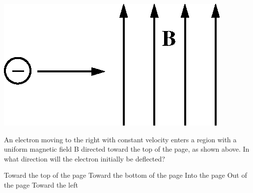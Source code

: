 \begin{center}
\includegraphics[scale=0.25]{images/img-013-026.png}
\end{center}

\begin{questions}\setcounter{question}{27}\question
An electron moving to the right with constant velocity enters a region with a uniform magnetic field B directed toward the top of the page, as shown above. In what direction will the electron initially be deflected?

\begin{choices}
\choice Toward the top of the page
\choice Toward the bottom of the page
\choice Into the page
\choice Out of the page
\choice Toward the left
\end{choices}\end{questions}

